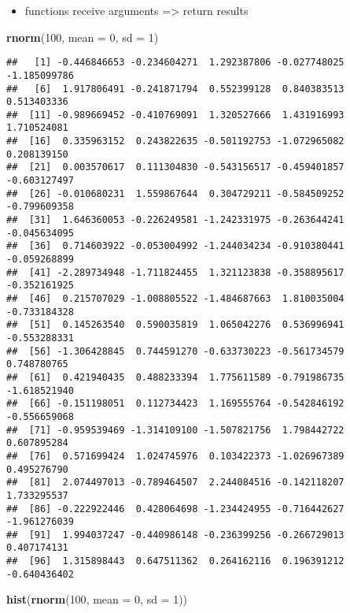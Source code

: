\documentclass[
  a4paper,
]{article}
\newenvironment{Shaded}{\begin{snugshade}}{\end{snugshade}}
\newcommand{\AttributeTok}[1]{\textcolor[rgb]{0.13,0.29,0.53}{#1}}
\newcommand{\DecValTok}[1]{\textcolor[rgb]{0.00,0.00,0.81}{#1}}
\newcommand{\FunctionTok}[1]{\textcolor[rgb]{0.13,0.29,0.53}{\textbf{#1}}}
\newcommand{\NormalTok}[1]{#1}
\providecommand{\tightlist}{%
  \setlength{\itemsep}{0pt}\setlength{\parskip}{0pt}}
\begin{document}
\begin{itemize}
\tightlist
\item
  functions receive arguments =\textgreater{} return results
\end{itemize}

\begin{Shaded}
\begin{Highlighting}[]
\FunctionTok{rnorm}\NormalTok{(}\DecValTok{100}\NormalTok{, }\AttributeTok{mean =} \DecValTok{0}\NormalTok{, }\AttributeTok{sd =} \DecValTok{1}\NormalTok{)}
\end{Highlighting}
\end{Shaded}

\begin{verbatim}
##   [1] -0.446846653 -0.234604271  1.292387806 -0.027748025 -1.185099786
##   [6]  1.917806491 -0.241871794  0.552399128  0.840383513  0.513403336
##  [11] -0.989669452 -0.410769091  1.320527666  1.431916993  1.710524081
##  [16]  0.335963152  0.243822635 -0.501192753 -1.072965082  0.208139150
##  [21]  0.003570617  0.111304830 -0.543156517 -0.459401857 -0.603127497
##  [26] -0.010680231  1.559867644  0.304729211 -0.584509252 -0.799609358
##  [31]  1.646360053 -0.226249581 -1.242331975 -0.263644241 -0.045634095
##  [36]  0.714603922 -0.053004992 -1.244034234 -0.910380441 -0.059268899
##  [41] -2.289734948 -1.711824455  1.321123838 -0.358895617 -0.352161925
##  [46]  0.215707029 -1.008805522 -1.484687663  1.810035004 -0.733184328
##  [51]  0.145263540  0.590035819  1.065042276  0.536996941 -0.553288331
##  [56] -1.306428845  0.744591270 -0.633730223 -0.561734579  0.748780765
##  [61]  0.421940435  0.488233394  1.775611589 -0.791986735 -1.618521940
##  [66] -0.151198051  0.112734423  1.169555764 -0.542846192 -0.556659068
##  [71] -0.959539469 -1.314109100 -1.507821756  1.798442722  0.607895284
##  [76]  0.571699424  1.024745976  0.103422373 -1.026967389  0.495276790
##  [81]  2.074497013 -0.789464507  2.244084516 -0.142118207  1.733295537
##  [86] -0.222922446  0.428064698 -1.234424955 -0.716442627 -1.961276039
##  [91]  1.994037247 -0.440986148 -0.236399256 -0.266729013  0.407174131
##  [96]  1.315898443  0.647511362  0.264162116  0.196391212 -0.640436402
\end{verbatim}

\begin{Shaded}
\begin{Highlighting}[]
\FunctionTok{hist}\NormalTok{(}\FunctionTok{rnorm}\NormalTok{(}\DecValTok{100}\NormalTok{, }\AttributeTok{mean =} \DecValTok{0}\NormalTok{, }\AttributeTok{sd =} \DecValTok{1}\NormalTok{))}
\end{Highlighting}
\end{Shaded}
\end{document}
